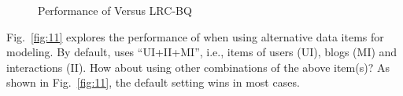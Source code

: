 \begin{figure}
  \centering
  \caption{Performance of \sys{} Versus LRC-BQ \tbc{}}
  \label{fig:10}
\end{figure}


Fig.\ \ref{fig:11} explores the performance of \sys{} when using alternative data items for modeling.
By default, \sys{} uses ``UI+II+MI'', i.e., items of users (UI), blogs (MI) and interactions (II).
How about using other combinations of the above item(s)?
As shown in Fig.\ \ref{fig:11}, the default setting wins in most cases.

